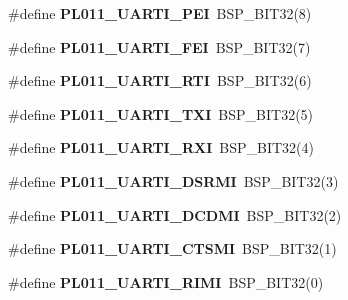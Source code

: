 \begin{DoxyCompactItemize}
\item 
\mbox{\label{arm-pl011-regs_8h_a95602ee9f40c05fe59252fed63fb1418}} 
\#define {\bfseries P\+L011\+\_\+\+U\+A\+R\+T\+I\+\_\+\+P\+EI}~B\+S\+P\+\_\+\+B\+I\+T32(8)
\item 
\mbox{\label{arm-pl011-regs_8h_ad7a06e89e1a42bdfd1912d6a07628be3}} 
\#define {\bfseries P\+L011\+\_\+\+U\+A\+R\+T\+I\+\_\+\+F\+EI}~B\+S\+P\+\_\+\+B\+I\+T32(7)
\item 
\mbox{\label{arm-pl011-regs_8h_a168371eb0f5334e9656c54bd42480ac0}} 
\#define {\bfseries P\+L011\+\_\+\+U\+A\+R\+T\+I\+\_\+\+R\+TI}~B\+S\+P\+\_\+\+B\+I\+T32(6)
\item 
\mbox{\label{arm-pl011-regs_8h_ab567853cbb2fe9380b6f162d75fa1715}} 
\#define {\bfseries P\+L011\+\_\+\+U\+A\+R\+T\+I\+\_\+\+T\+XI}~B\+S\+P\+\_\+\+B\+I\+T32(5)
\item 
\mbox{\label{arm-pl011-regs_8h_aae91e4b4ac20819319c603709b6d861e}} 
\#define {\bfseries P\+L011\+\_\+\+U\+A\+R\+T\+I\+\_\+\+R\+XI}~B\+S\+P\+\_\+\+B\+I\+T32(4)
\item 
\mbox{\label{arm-pl011-regs_8h_a262c646ea322edbc8b1185536aa03525}} 
\#define {\bfseries P\+L011\+\_\+\+U\+A\+R\+T\+I\+\_\+\+D\+S\+R\+MI}~B\+S\+P\+\_\+\+B\+I\+T32(3)
\item 
\mbox{\label{arm-pl011-regs_8h_ab7fe527feee96e7673aadfdd7efd2771}} 
\#define {\bfseries P\+L011\+\_\+\+U\+A\+R\+T\+I\+\_\+\+D\+C\+D\+MI}~B\+S\+P\+\_\+\+B\+I\+T32(2)
\item 
\mbox{\label{arm-pl011-regs_8h_ae286381f006f5762d3cb01799c9f5013}} 
\#define {\bfseries P\+L011\+\_\+\+U\+A\+R\+T\+I\+\_\+\+C\+T\+S\+MI}~B\+S\+P\+\_\+\+B\+I\+T32(1)
\item 
\mbox{\label{arm-pl011-regs_8h_a40b7e417a2f26dfcf4981ea17921e22f}} 
\#define {\bfseries P\+L011\+\_\+\+U\+A\+R\+T\+I\+\_\+\+R\+I\+MI}~B\+S\+P\+\_\+\+B\+I\+T32(0)
\item 
\mbox{\label{arm-pl011-regs_8h_a4637df565f1ab6815a799d3315157dfa}} 

\end{DoxyCompactItemize}
